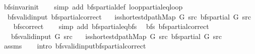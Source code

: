 \begin{isabellebody}
\ bfs{\isacharunderscore}{\kern0pt}invar{\isacharunderscore}{\kern0pt}init\isanewline
\ \ \isamarkupfalse%
\ {\isacharparenleft}{\kern0pt}simp\ add{\isacharcolon}{\kern0pt}\ bfs{\isacharunderscore}{\kern0pt}partial{\isacharunderscore}{\kern0pt}def\ loop{\isacharunderscore}{\kern0pt}partial{\isacharunderscore}{\kern0pt}eq{\isacharunderscore}{\kern0pt}loop{\isacharparenright}{\kern0pt}%
\endisatagproof
{\isafoldproof}%
%
\isadelimproof
\isanewline
%
\endisadelimproof
\isanewline
{}\isamarkupfalse%
\ {\isacharparenleft}{\kern0pt}\ bfs{\isacharunderscore}{\kern0pt}valid{\isacharunderscore}{\kern0pt}input{\isacharparenright}{\kern0pt}\ bfs{\isacharunderscore}{\kern0pt}partial{\isacharunderscore}{\kern0pt}correct{\isacharcolon}{\kern0pt}\isanewline
\ \ \ {\isachardoublequoteopen}is{\isacharunderscore}{\kern0pt}shortest{\isacharunderscore}{\kern0pt}dpath{\isacharunderscore}{\kern0pt}Map\ G\ src\ {\isacharparenleft}{\kern0pt}bfs{\isacharunderscore}{\kern0pt}partial\ G\ src{\isacharparenright}{\kern0pt}{\isachardoublequoteclose}\isanewline
%
\isadelimproof
\ \ %
\endisadelimproof
%
\isatagproof
{}\isamarkupfalse%
\ bfs{\isacharunderscore}{\kern0pt}correct\isanewline
\ \ \isamarkupfalse%
\ {\isacharparenleft}{\kern0pt}simp\ add{\isacharcolon}{\kern0pt}\ bfs{\isacharunderscore}{\kern0pt}partial{\isacharunderscore}{\kern0pt}eq{\isacharunderscore}{\kern0pt}bfs{\isacharparenright}{\kern0pt}%
\endisatagproof
{\isafoldproof}%
%
\isadelimproof
\isanewline
%
\endisadelimproof
\isanewline
{}\isamarkupfalse%
\ {\isacharparenleft}{\kern0pt}\ bfs{\isacharparenright}{\kern0pt}\ bfs{\isacharunderscore}{\kern0pt}partial{\isacharunderscore}{\kern0pt}correct{\isacharcolon}{\kern0pt}\isanewline
\ \ \ {\isachardoublequoteopen}bfs{\isacharunderscore}{\kern0pt}valid{\isacharunderscore}{\kern0pt}input{\isacharprime}{\kern0pt}\ G\ src{\isachardoublequoteclose}\isanewline
\ \ \ {\isachardoublequoteopen}is{\isacharunderscore}{\kern0pt}shortest{\isacharunderscore}{\kern0pt}dpath{\isacharunderscore}{\kern0pt}Map\ G\ src\ {\isacharparenleft}{\kern0pt}bfs{\isacharunderscore}{\kern0pt}partial\ G\ src{\isacharparenright}{\kern0pt}{\isachardoublequoteclose}\isanewline
%
\isadelimproof
\ \ %
\endisadelimproof
%
\isatagproof
{}\isamarkupfalse%
\ assms\isanewline
\ \ \isamarkupfalse%
\ {\isacharparenleft}{\kern0pt}intro\ bfs{\isacharunderscore}{\kern0pt}valid{\isacharunderscore}{\kern0pt}input{\isachardot}{\kern0pt}bfs{\isacharunderscore}{\kern0pt}partial{\isacharunderscore}{\kern0pt}correct{\isacharparenright}{\kern0pt}%
\endisatagproof
{\isafoldproof}%
%
\isadelimproof
\isanewline
%
\endisadelimproof
%
\isadelimtheory
\isanewline
%
\endisadelimtheory
%
\isatagtheory
{}\isamarkupfalse%
%
\endisatagtheory
{\isafoldtheory}%
%
\isadelimtheory
%
\endisadelimtheory
%
\end{isabellebody}%
